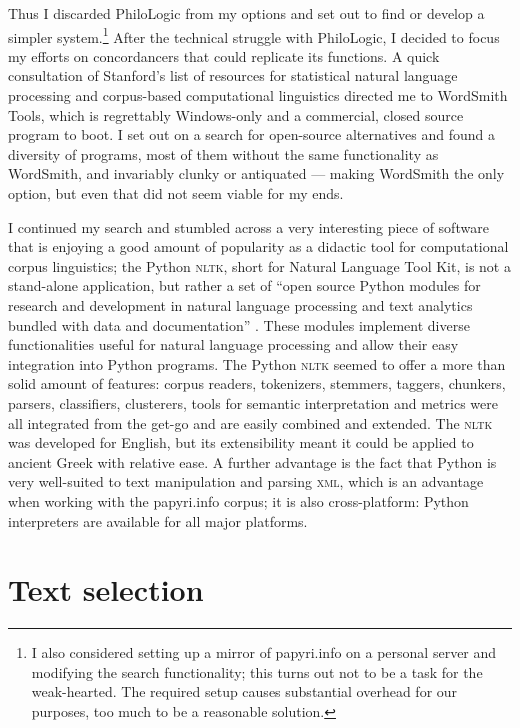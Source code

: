 Thus I discarded PhiloLogic from my options and set out to find or develop a
simpler system.\footnote{I also considered setting up a mirror of papyri.info
  on a personal server and modifying the search functionality; this turns out
  not to be a task for the weak-hearted. The required setup causes substantial
overhead for our purposes, too much to be a reasonable solution.} After the
technical struggle with PhiloLogic, I decided to focus my efforts on
concordancers that could replicate its functions. A quick consultation of
Stanford's list of resources \citep{stanfordnlpres} for statistical natural
language processing and corpus-based computational linguistics directed me to
WordSmith Tools, which is regrettably Windows-only and a commercial, closed
source program to boot.  I set out on a search for open-source alternatives and
found a diversity of programs, most of them without the same functionality as
WordSmith, and invariably clunky or antiquated --- making WordSmith the only
option, but even that did not seem viable for my ends.

I continued my search and stumbled across a very interesting piece of software
that is enjoying a good amount of popularity as a didactic tool for
computational corpus linguistics; the Python \textsc{nltk}, short for Natural
Language Tool Kit, is not a stand-alone application, but rather a set of ``open
source Python modules for research and development in natural language
processing and text analytics bundled with data and documentation''
\citep{nltkhome}. These modules implement diverse functionalities useful for
natural language processing and allow their easy integration into Python
programs. The Python \textsc{nltk} seemed to offer a more than solid amount of
features: corpus readers, tokenizers, stemmers, taggers, chunkers, parsers,
classifiers, clusterers, tools for semantic interpretation and metrics were all
integrated from the get-go and are easily combined and extended. The
\textsc{nltk} was developed for English, but its extensibility meant it could
be applied to ancient Greek with relative ease. A further advantage is the fact
that Python is very well-suited to text manipulation and parsing \textsc{xml},
which is an advantage when working with the papyri.info corpus; it is also
cross-platform: Python interpreters are available for all major platforms.

\section{Text selection}

